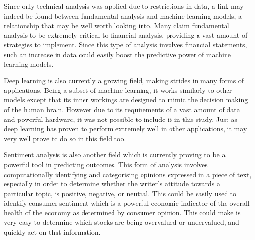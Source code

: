 Since only technical analysis was applied due to restrictions in data, a link may indeed be found between fundamental analysis and machine learning models, a relationship that may be well worth looking into. Many claim fundamental analysis to be extremely critical to financial analysis, providing a vast amount of strategies to implement. Since this type of analysis involves financial statements, such an increase in data could easily boost the predictive power of machine learning models.

Deep learning is also currently a growing field, making strides in many forms of applications. Being a subset of machine learning, it works similarly to other models except that its inner workings are designed to mimic the decision making of the human brain. However due to its requirements of a vast amount of data and powerful hardware, it was not possible to include it in this study. Just as deep learning has proven to perform extremely well in other applications, it may very well prove to do so in this field too.

Sentiment analysis is also another field which is currently proving to be a powerful tool in predicting outcomes. This form of analysis involves computationally identifying and categorising opinions expressed in a piece of text, especially in order to determine whether the writer's attitude towards a particular topic, is positive, negative, or neutral. This could be easily used to identify consumer sentiment which is a powerful economic indicator of the overall health of the economy as determined by consumer opinion. This could make is very easy to determine which stocks are being overvalued or undervalued, and quickly act on that information.